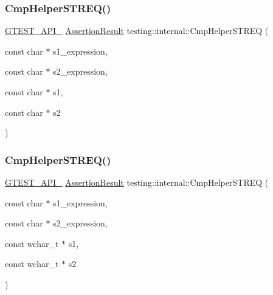 \mbox{\label{namespacetesting_1_1internal_a93eb9d61cac7faf1faff6301ae5f4a46}} 
\subsubsection{\texorpdfstring{CmpHelperSTREQ()}{CmpHelperSTREQ()}\hspace{0.1cm}{\footnotesize\ttfamily [1/2]}}
{\footnotesize\ttfamily \mbox{\hyperlink{gtest-port_8h_aa73be6f0ba4a7456180a94904ce17790}{G\+T\+E\+S\+T\+\_\+\+A\+P\+I\+\_\+}} \mbox{\hyperlink{classtesting_1_1_assertion_result}{Assertion\+Result}} testing\+::internal\+::\+Cmp\+Helper\+S\+T\+R\+EQ (\begin{DoxyParamCaption}\item[{const char $\ast$}]{s1\+\_\+expression,  }\item[{const char $\ast$}]{s2\+\_\+expression,  }\item[{const char $\ast$}]{s1,  }\item[{const char $\ast$}]{s2 }\end{DoxyParamCaption})}

\mbox{\label{namespacetesting_1_1internal_ad40d557f9c157790160d6e4f2b0d9bab}} 
\subsubsection{\texorpdfstring{CmpHelperSTREQ()}{CmpHelperSTREQ()}\hspace{0.1cm}{\footnotesize\ttfamily [2/2]}}
{\footnotesize\ttfamily \mbox{\hyperlink{gtest-port_8h_aa73be6f0ba4a7456180a94904ce17790}{G\+T\+E\+S\+T\+\_\+\+A\+P\+I\+\_\+}} \mbox{\hyperlink{classtesting_1_1_assertion_result}{Assertion\+Result}} testing\+::internal\+::\+Cmp\+Helper\+S\+T\+R\+EQ (\begin{DoxyParamCaption}\item[{const char $\ast$}]{s1\+\_\+expression,  }\item[{const char $\ast$}]{s2\+\_\+expression,  }\item[{const wchar\+\_\+t $\ast$}]{s1,  }\item[{const wchar\+\_\+t $\ast$}]{s2 }\end{DoxyParamCaption})}

